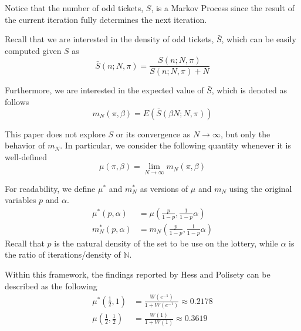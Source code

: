 \documentclass{article}
\newcommand{\N}{\mathbb{N}}
\newcommand{\ppar}[1]{\left( #1 \right)}
\begin{document}
Notice that the number of odd tickets, $S$, is a Markov Process since the result of the current iteration fully determines the next iteration.

Recall that we are interested in the density of odd tickets, $\bar{S}$, which can be easily computed given $S$ as
\begin{equation}
    \bar{S}\ppar{n; N, \pi} =
    \frac{S\ppar{n; N, \pi}}{S\ppar{n; N, \pi} + N}
\end{equation}

Furthermore, we are interested in the expected value of $\bar{S}$, which is denoted as follows
\begin{equation}
    m_N\ppar{\pi, \beta} = E\ppar{\bar{S}\ppar{\beta N; N, \pi }}
\end{equation}

This paper does not explore $S$ or its convergence as $N \rightarrow \infty$, but only the behavior of $m_N$. 
%
In particular, we consider the following quantity whenever it is well-defined
\begin{equation}
    \mu\ppar{\pi, \beta} = \lim_{N\rightarrow \infty} m_N\ppar{\pi, \beta}
\end{equation}

For readability, we define $\mu^*$ and $m_N^*$ as versions of $\mu$ and $m_N$ using the original variables $p$ and $\alpha$. 
\begin{align}
    \mu^*\ppar{p, \alpha} &= \mu\ppar{\frac{p}{1-p}, \frac{1}{1-p} \alpha}
    \\
    m_N^*\ppar{p, \alpha} &= m_N\ppar{\frac{p}{1-p}, \frac{1}{1-p} \alpha}
\end{align}
Recall that $p$ is the natural density of the set to be use on the lottery, while $\alpha$ is the ratio of iterations/density of $\N$.


Within this framework,
the findings reported by Hess and Polisety \cite{hess2023} can be described as the following
\begin{align}
\mu^*\ppar{\frac{1}{2}, 1}
    &=
    \frac{W\ppar{e^{-1}}}{1+W\ppar{e^{-1}}} \approx 0.2178
    \\
\mu\ppar{\frac{1}{2}, \frac{1}{2}}
    &=
    \frac{W\ppar{1}}{1+W\ppar{1}} \approx 0.3619
\end{align}

\end{document}
